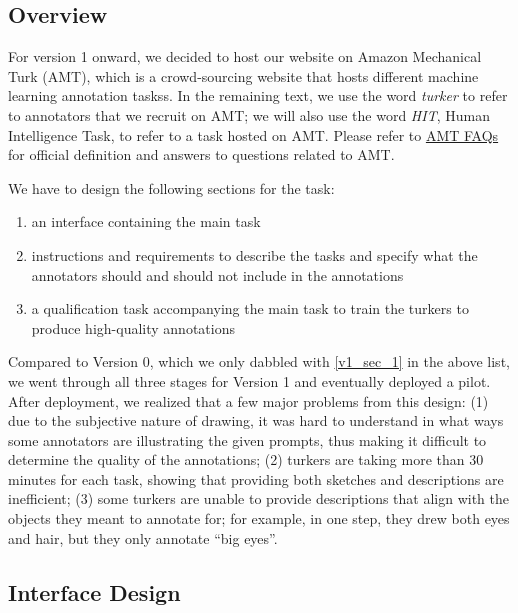 \subsection{Overview}
For version 1 onward, we decided to host our website on Amazon Mechanical Turk (AMT), which is a crowd-sourcing website that hosts different machine learning annotation taskss. In the remaining text, we use the word \textit{turker} to refer to annotators that we recruit on AMT; we will also use the word \textit{HIT}, Human Intelligence Task, to refer to a task hosted on AMT. Please refer to \href{https://www.mturk.com/worker/help#:~:text=A%20Human%20Intelligence%20Task%2C%20or,be%20completed%20by%20Worker%20customers.}{AMT FAQs} for official definition and answers to questions related to AMT. 
 
We have to design the following sections for the task: 
\begin{enumerate}
    \item \label{v1_sec_1} an interface containing the main task
    \item instructions and requirements to describe the tasks and specify what the annotators should and should not include in the annotations
    \item a qualification task accompanying the main task to train the turkers to produce high-quality annotations
\end{enumerate}
Compared to Version 0, which we only dabbled with \ref{v1_sec_1} in the above list, we went through all three stages for Version 1 and eventually deployed a pilot.
After deployment, we realized that a few major problems from this design: (1) due to the subjective nature of drawing, it was hard to understand in what ways some annotators are illustrating the given prompts, thus making it difficult to determine the quality of the annotations; (2) turkers are taking more than 30 minutes for each task, showing that providing both sketches and descriptions are inefficient; (3) some turkers are unable to provide descriptions that align with the objects they meant to annotate for; for example, in one step, they drew both eyes and hair, but they only annotate ``big eyes''.      


\subsection{Interface Design}

